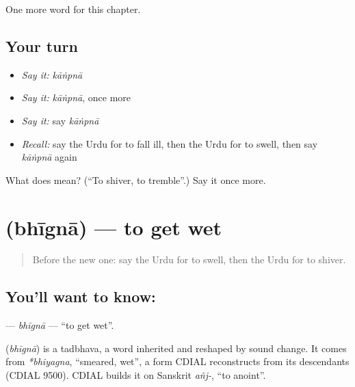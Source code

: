 \begin{grammarlens}[title={What you've built}]
One more word for this chapter.
\end{grammarlens}

\subsection*{Your turn}
\begin{itemize}
\raggedright
  \item \emph{Say it:} \emph{kāṅpnā}
  \item \emph{Say it:} \emph{kāṅpnā}, once more
  \item \emph{Say it:} say \emph{kāṅpnā}
  \item \emph{Recall:} say the Urdu for to fall ill, then the Urdu for to swell, then say \emph{kāṅpnā} again
\end{itemize}

\begin{tcolorbox}[breakable,colback=teal!4,colframe=teal!35!black,title={Before you move on}]
What does  mean? (\textquotedblleft{}To shiver, to tremble\textquotedblright{}.) Say it once more.
\end{tcolorbox}
\section[\texorpdfstring{\ur{بھیگنا} (bhīgnā)}{بھیگنا (bhīgnā)}]{ (bhīgnā) — to get wet}

\label{lesson:UR-C184-bhigna}



\begin{quote}
Before the new one: say the Urdu for to swell, then the Urdu for to shiver.
\end{quote}

\subsection*{You'll want to know: }
\textbf{} — \emph{bhīgnā} — \textquotedblleft{}to get wet\textquotedblright{}.

\begin{cousinweb}
\textbf{} (\emph{bhīgnā}) is a tadbhava, a word inherited and reshaped by sound change. It comes from \emph{*bhiyagna}, \textquotedblleft{}smeared, wet\textquotedblright{}, a form CDIAL reconstructs from its descendants (CDIAL 9500). CDIAL builds it on Sanskrit \emph{añj-}, \textquotedblleft{}to anoint\textquotedblright{}.
\end{cousinweb}

